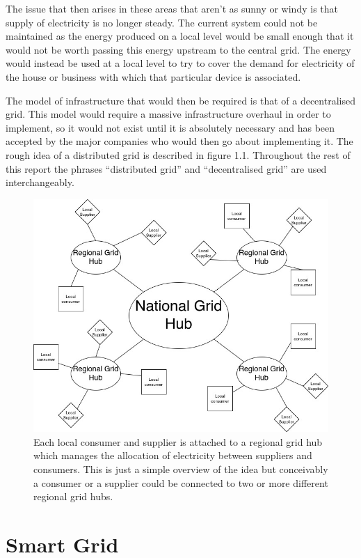 \documentclass[a4paper, notitlepage]{report}
\begin{document}
The issue that then arises in these areas that aren’t as sunny or windy is that
supply of electricity is no longer steady. The current system could not be
maintained as the energy produced on a local level would be small enough that it
would not be worth passing this energy upstream to the central grid. The energy
would instead be used at a local level to try to cover the demand for
electricity of the house or business with which that particular device is
associated.

The model of infrastructure that would then be required is that of a
decentralised grid. This model would require a massive infrastructure overhaul
in order to implement, so it would not exist until it is absolutely necessary
and has been accepted by the major companies who would then go about
implementing it. The rough idea of a distributed grid is described in figure
1.1. Throughout the rest of this report the phrases “distributed grid” and
“decentralised grid” are used interchangeably.

\begin{figure}[htbp]
\centering
\includegraphics[width=.9\linewidth]{./img/DecentralisedGrid.jpg}
\caption{\label{fig:orge4f8ab7}
Each local consumer and supplier is attached to a regional grid hub which manages the allocation of electricity between suppliers and consumers. This is just a simple overview of the idea but conceivably a consumer or a supplier could be connected to two or more different regional grid hubs.}
\end{figure}
\chapter{Smart Grid}
\label{sec:org4a405ee}
\end{document}
